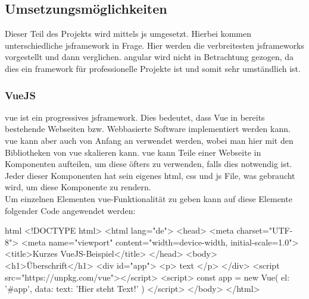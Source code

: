 \subsection{Umsetzungsmöglichkeiten}
Dieser Teil des Projekts wird mittels \Gls{js} umgesetzt. Hierbei kommen unterschiedliche \Gls{jsframework} in Frage. Hier werden die verbreitesten \Gls{jsframework}s vorgestellt und dann verglichen. \Gls{angular} wird nicht in Betrachtung gezogen, da dies ein \Gls{framework}  für professionelle Projekte ist und somit sehr umständlich ist\cite{angular_ex}.
\subsubsection{VueJS}
\gls{vue} ist ein progressives \Gls{jsframework}. Dies bedeutet, dass Vue in bereits bestehende Webseiten bzw. Webbasierte Software implementiert werden kann.\\
\Gls{vue} kann aber auch von Anfang an verwendet werden, wobei man hier mit den Bibliotheken von \Gls{vue} skalieren kann\cite{vuedoc}. \Gls{vue} kann Teile einer Webseite in Komponenten aufteilen, um diese öfters zu verwenden, falls dies notwendig ist. Jeder dieser Komponenten hat sein eigenes \Gls{html}, \Gls{css} und \Gls{js} File, was gebraucht wird, um diese Komponente zu rendern.\\
Um einzelnen Elementen \Gls{vue}-Funktionalität zu geben kann auf diese Elemente folgender Code angewendet werden\cite{vuedoc}:
\begin{code}{html}
	<!DOCTYPE html>
	<html lang="de">
		<head>
			<meta charset="UTF-8">
			<meta name="viewport" content="width=device-width, initial-scale=1.0">
			<title>Kurzes VueJS-Beispiel</title>
		</head>
		<body>
			<h1>Überschrift</h1>
			<div id="app">
				<p> {{ text }} </p>
			</div>
			<script src="https://unpkg.com/vue"></script>
			<script>
				const app = new Vue({
					el: '#app',
					data: {
						text: 'Hier steht Text!'
					}
				})
			</script>
		</body>
	</html>
\end{code}
